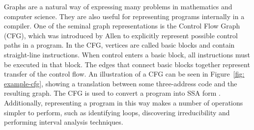 Graphs are a natural way of expressing many problems in mathematics and computer science. They are also useful for representing programs internally in a compiler. One of the seminal graph representations is the Control Flow Graph (CFG), which was introduced by Allen \cite{808479} to explicitly represent possible control paths in a program. In the CFG, vertices are called basic blocks and contain straight-line instructions. When control enters a basic block, all instructions must be executed in that block. The edges that connect basic blocks together represent transfer of the control flow. An illustration of a CFG can be seen in Figure~\ref{fig: example-cfg}, showing a translation between some three-address code and the resulting graph. The CFG is used to convert a program into SSA form \cite{115320}. Additionally, representing a program in this way makes a number of operations simpler to perform, such as identifying loops, discovering irreducibility and performing interval analysis techniques.

